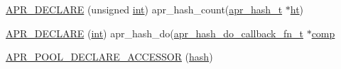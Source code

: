\begin{DoxyCompactItemize}
\item 
\hyperlink{group__apr__hash_gaf86c4ba2e44173e928ccf1e251f3aeee}{A\+P\+R\+\_\+\+D\+E\+C\+L\+A\+RE} (unsigned \hyperlink{pcre_8txt_a42dfa4ff673c82d8efe7144098fbc198}{int}) apr\+\_\+hash\+\_\+count(\hyperlink{structapr__hash__t}{apr\+\_\+hash\+\_\+t} $\ast$\hyperlink{group__apr__hash_ga18cf3e4c61221aa79a41989befa7839f}{ht})
\item 
\hyperlink{group__apr__hash_gac18b30b00f6ca75fb8e99343e5aa4943}{A\+P\+R\+\_\+\+D\+E\+C\+L\+A\+RE} (\hyperlink{pcre_8txt_a42dfa4ff673c82d8efe7144098fbc198}{int}) apr\+\_\+hash\+\_\+do(\hyperlink{group__apr__hash_ga9352d7eed661ad06b7635314530a3227}{apr\+\_\+hash\+\_\+do\+\_\+callback\+\_\+fn\+\_\+t} $\ast$\hyperlink{group__apr__skiplist_ga4c81b1eebdb8efeefcadd27cb3fe1c31}{comp}
\item 
\hyperlink{group__apr__hash_gab9e4fd3d9d64d5c72a578845d2b1fa25}{A\+P\+R\+\_\+\+P\+O\+O\+L\+\_\+\+D\+E\+C\+L\+A\+R\+E\+\_\+\+A\+C\+C\+E\+S\+S\+OR} (\hyperlink{testpass_8c_adfc0cb134ace18ba7fde0fefbae7a391}{hash})
\end{DoxyCompactItemize}
